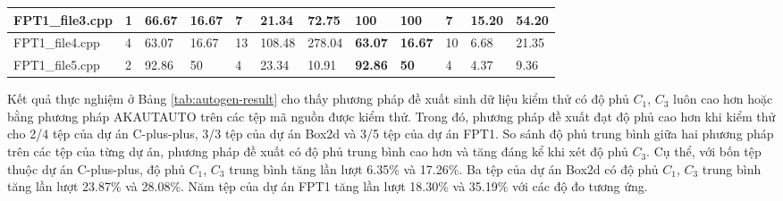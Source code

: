 \begin{table}[h]
{\begin{tabular}{|l|l|lllll|lllll|}
FPT1\_file3.cpp                                   & 1                                                   & \multicolumn{1}{l|}{66.67} & \multicolumn{1}{l|}{16.67} & \multicolumn{1}{l|}{7}   & \multicolumn{1}{l|}{21.34}   & 72.75                     & \multicolumn{1}{l|}{\textbf{100}}   & \multicolumn{1}{l|}{\textbf{100}}   & \multicolumn{1}{l|}{7}   & \multicolumn{1}{l|}{15.20}   & 54.20                     \\ \hline
FPT1\_file4.cpp                                    & 4                                                   & \multicolumn{1}{l|}{63.07} & \multicolumn{1}{l|}{16.67} & \multicolumn{1}{l|}{13}  & \multicolumn{1}{l|}{108.48}  & 278.04                    & \multicolumn{1}{l|}{\textbf{63.07}} & \multicolumn{1}{l|}{\textbf{16.67}} & \multicolumn{1}{l|}{10}  & \multicolumn{1}{l|}{6.68}    & 21.35                     \\ \hline
FPT1\_file5.cpp                                 & 2                                                   & \multicolumn{1}{l|}{92.86} & \multicolumn{1}{l|}{50}    & \multicolumn{1}{l|}{4}   & \multicolumn{1}{l|}{23.34}   & 10.91                     & \multicolumn{1}{l|}{\textbf{92.86}} & \multicolumn{1}{l|}{\textbf{50}}    & \multicolumn{1}{l|}{4}   & \multicolumn{1}{l|}{4.37}    & 9.36                      \\ \hline
\end{tabular}%
}
\end{table}

Kết quả thực nghiệm ở Bảng \ref{tab:autogen-result} cho thấy phương pháp đề xuất sinh dữ liệu kiểm thử có độ phủ $C_1$, $C_3$ luôn cao hơn hoặc bằng phương pháp AKAUTAUTO trên các tệp mã nguồn được kiểm thử. Trong đó, phương pháp đề xuất đạt độ phủ cao hơn khi kiểm thử cho 2/4 tệp của dự án C-plus-plus, 3/3 tệp của dự án Box2d và 3/5 tệp của dự án FPT1. So sánh độ phủ trung bình giữa hai phương pháp trên các tệp của từng dự án, phương pháp đề xuất có độ phủ trung bình cao hơn và tăng đáng kể khi xét độ phủ $C_3$. Cụ thể, với bốn tệp thuộc dự án C-plus-plus, độ phủ $C_1$, $C_3$ trung bình tăng lần lượt 6.35\% và 17.26\%. Ba tệp của dự án Box2d có độ phủ $C_1$, $C_3$ trung bình tăng lần lượt 23.87\% và 28.08\%. Năm tệp của dự án FPT1 tăng lần lượt 18.30\% và 35.19\% với các độ đo tương ứng.

